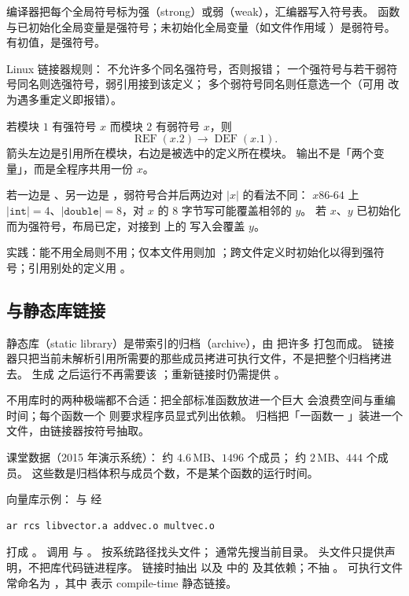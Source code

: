 编译器把每个全局符号标为强（strong）或弱（weak），汇编器写入符号表。
函数与已初始化全局变量是强符号；未初始化全局变量（如文件作用域 ）是弱符号。
 有初值，是强符号。

Linux 链接器规则：
不允许多个同名强符号，否则报错；
一个强符号与若干弱符号同名则选强符号，弱引用接到该定义；
多个弱符号同名则任意选一个（可用  改为遇多重定义即报错）。

若模块 $1$ 有强符号 $x$ 而模块 $2$ 有弱符号 $x$，则
\[
\operatorname{REF}(x.2)\to\operatorname{DEF}(x.1).
\]
箭头左边是引用所在模块，右边是被选中的定义所在模块。
输出不是「两个变量」，而是全程序共用一份 $x$。

若一边是 、另一边是 ，弱符号合并后两边对 $\lvert x\rvert$ 的看法不同：
$x86$-$64$ 上 $\lvert\texttt{int}\rvert=4$、$\lvert\texttt{double}\rvert=8$，对 $x$ 的 $8$ 字节写可能覆盖相邻的 $y$。
若 $x$、$y$ 已初始化而为强符号，布局已定，对接到  上的  写入会覆盖 $y$。

实践：能不用全局则不用；仅本文件用则加 ；跨文件定义时初始化以得到强符号；引用别处的定义用 。

\subsection{与静态库链接}



静态库（static library）是带索引的归档（archive），由  把许多  打包而成。
链接器只把当前未解析引用所需要的那些成员拷进可执行文件，不是把整个归档拷进去。
生成  之后运行不再需要该 ；重新链接时仍需提供 。

不用库时的两种极端都不合适：把全部标准函数放进一个巨大  会浪费空间与重编时间；每个函数一个  则要求程序员显式列出依赖。
归档把「一函数一 」装进一个文件，由链接器按符号抽取。

课堂数据（2015 年演示系统）： 约 $4.6\,\mathrm{MB}$、$1496$ 个成员； 约 $2\,\mathrm{MB}$、$444$ 个成员。
这些数是归档体积与成员个数，不是某个函数的运行时间。

向量库示例： 与  经
\begin{lstlisting}
ar rcs libvector.a addvec.o multvec.o
\end{lstlisting}
打成 。
 调用  与 。
 按系统路径找头文件； 通常先搜当前目录。
头文件只提供声明，不把库代码链进程序。
链接时抽出  以及  中的  及其依赖；不抽 。
可执行文件常命名为 ，其中  表示 compile-time 静态链接。

